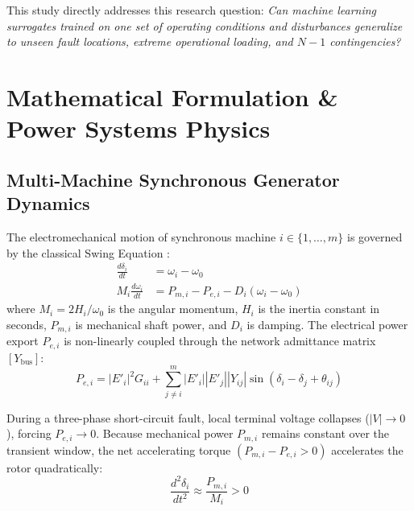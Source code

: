 \documentclass[journal]{IEEEtran}
\begin{document}
This study directly addresses this research question: \textit{Can machine learning surrogates trained on one set of operating conditions and disturbances generalize to unseen fault locations, extreme operational loading, and $N-1$ contingencies?}

\section{Mathematical Formulation \& Power Systems Physics}

\subsection{Multi-Machine Synchronous Generator Dynamics}
The electromechanical motion of synchronous machine $i \in \{1, \dots, m\}$ is governed by the classical Swing Equation \cite{kundur1994power}:
\begin{align}
\frac{d\delta_i}{dt} &= \omega_i - \omega_0 \\
M_i \frac{d\omega_i}{dt} &= P_{m,i} - P_{e,i} - D_i (\omega_i - \omega_0)
\end{align}
where $M_i = 2H_i/\omega_0$ is the angular momentum, $H_i$ is the inertia constant in seconds, $P_{m,i}$ is mechanical shaft power, and $D_i$ is damping. The electrical power export $P_{e,i}$ is non-linearly coupled through the network admittance matrix $[Y_{\text{bus}}]$:
\begin{equation}
P_{e,i} = |E'_i|^2 G_{ii} + \sum_{j \neq i}^{m} |E'_i| |E'_j| |Y_{ij}| \sin(\delta_i - \delta_j + \theta_{ij})
\end{equation}

During a three-phase short-circuit fault, local terminal voltage collapses ($|V| \to 0$), forcing $P_{e,i} \to 0$. Because mechanical power $P_{m,i}$ remains constant over the transient window, the net accelerating torque $(P_{m,i} - P_{e,i} > 0)$ accelerates the rotor quadratically:
\begin{equation}
\frac{d^2\delta_i}{dt^2} \approx \frac{P_{m,i}}{M_i} > 0
\end{equation}
\end{document}
